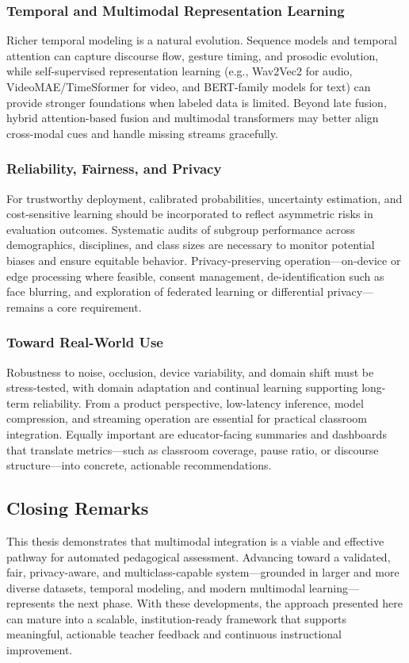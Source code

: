 \subsubsection{Temporal and Multimodal Representation Learning}
Richer temporal modeling is a natural evolution. Sequence models and temporal attention can capture discourse flow, gesture timing, and prosodic evolution, while self-supervised representation learning (e.g., Wav2Vec2 for audio, VideoMAE/TimeSformer for video, and BERT-family models for text) can provide stronger foundations when labeled data is limited. Beyond late fusion, hybrid attention-based fusion and multimodal transformers may better align cross-modal cues and handle missing streams gracefully.

\subsubsection{Reliability, Fairness, and Privacy}
For trustworthy deployment, calibrated probabilities, uncertainty estimation, and cost-sensitive learning should be incorporated to reflect asymmetric risks in evaluation outcomes. Systematic audits of subgroup performance across demographics, disciplines, and class sizes are necessary to monitor potential biases and ensure equitable behavior. Privacy-preserving operation—on-device or edge processing where feasible, consent management, de-identification such as face blurring, and exploration of federated learning or differential privacy—remains a core requirement.

\subsubsection{Toward Real-World Use}
Robustness to noise, occlusion, device variability, and domain shift must be stress-tested, with domain adaptation and continual learning supporting long-term reliability. From a product perspective, low-latency inference, model compression, and streaming operation are essential for practical classroom integration. Equally important are educator-facing summaries and dashboards that translate metrics—such as classroom coverage, pause ratio, or discourse structure—into concrete, actionable recommendations.

\subsection{Closing Remarks}
This thesis demonstrates that multimodal integration is a viable and effective pathway for automated pedagogical assessment. Advancing toward a validated, fair, privacy-aware, and multiclass-capable system—grounded in larger and more diverse datasets, temporal modeling, and modern multimodal learning—represents the next phase. With these developments, the approach presented here can mature into a scalable, institution-ready framework that supports meaningful, actionable teacher feedback and continuous instructional improvement.
